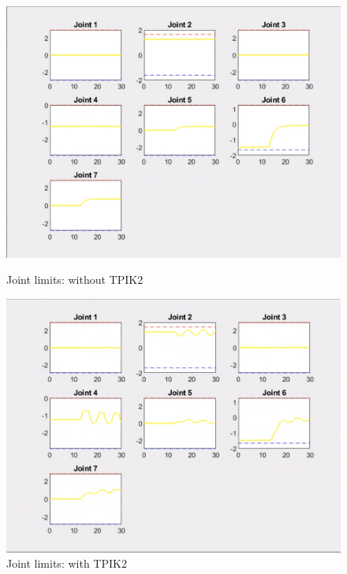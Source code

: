 \documentclass{article}
\begin{document}
\begin{figure}[htpb] 
\begin{minipage}{0.40\textwidth} 
\includegraphics[width=\textwidth]{522_1_wout_TPIK2.png} 
\caption[Joint limits: without TPIK2]{Joint limits: without TPIK2}\label{JL_wout_TPIK2} 
\end{minipage} 
\hspace{0.2\textwidth} 
\begin{minipage}{0.40\textwidth}  
\includegraphics[width=\textwidth]{522_1_w_TPIK2.png}
\caption[Joint limits: with TPIK2]{Joint limits: with TPIK2}\label{JL_w_TPIK2} 
\end{minipage}  
\end{figure}
\end{document}
